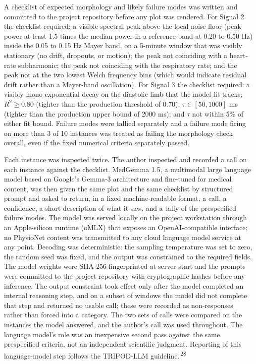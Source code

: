 \documentclass[twocolumn,letterpaper,10pt]{article}
\renewcommand{\cite}[1]{\textsuperscript{\,#1}}
\begin{document}
A checklist of expected morphology and likely failure modes was written and committed to the project repository before any plot was rendered. For Signal 2 the checklist required: a visible spectral peak above the local noise floor (peak power at least 1.5 times the median power in a reference band at 0.20 to 0.50 Hz) inside the 0.05 to 0.15 Hz Mayer band, on a 5-minute window that was visibly stationary (no drift, dropouts, or motion); the peak not coinciding with a heart-rate subharmonic; the peak not coinciding with the respiratory rate; and the peak not at the two lowest Welch frequency bins (which would indicate residual drift rather than a Mayer-band oscillation). For Signal 3 the checklist required: a visibly mono-exponential decay on the diastolic limb that the model fit tracks; $R^2 \geq 0.80$ (tighter than the production threshold of 0.70); $\tau \in [50, 1000]$ ms (tighter than the production upper bound of 2000 ms); and $\tau$ not within 5\% of either fit bound. Failure modes were tallied separately and a failure mode firing on more than 3 of 10 instances was treated as failing the morphology check overall, even if the fixed numerical criteria separately passed.

Each instance was inspected twice. The author inspected and recorded a call on each instance against the checklist. MedGemma 1.5, a multimodal large language model based on Google's Gemma-3 architecture and fine-tuned for medical content, was then given the same plot and the same checklist by structured prompt and asked to return, in a fixed machine-readable format, a call, a confidence, a short description of what it saw, and a tally of the prespecified failure modes. The model was served locally on the project workstation through an Apple-silicon runtime (oMLX) that exposes an OpenAI-compatible interface; no PhysioNet content was transmitted to any cloud language model service at any point. Decoding was deterministic: the sampling temperature was set to zero, the random seed was fixed, and the output was constrained to the required fields. The model weights were SHA-256 fingerprinted at server start and the prompts were committed to the project repository with cryptographic hashes before any inference. The output constraint took effect only after the model completed an internal reasoning step, and on a subset of windows the model did not complete that step and returned no usable call; these were recorded as non-responses rather than forced into a category. The two sets of calls were compared on the instances the model answered, and the author's call was used throughout. The language model's role was an inexpensive second pass against the same prespecified criteria, not an independent scientific judgment. Reporting of this language-model step follows the TRIPOD-LLM guideline.\cite{28}
\end{document}
